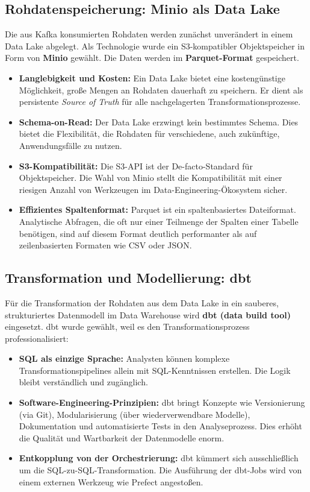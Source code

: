 \documentclass[
    12pt,               
    a4paper,        
    ngerman            
]{scrartcl}
\begin{document}
\subsection{Rohdatenspeicherung: Minio als Data Lake}
\label{subsec:minio}

Die aus Kafka konsumierten Rohdaten werden zunächst unverändert in einem Data Lake abgelegt. Als Technologie wurde ein S3-kompatibler Objektspeicher in Form von \textbf{Minio} gewählt. Die Daten werden im \textbf{Parquet-Format} gespeichert.
\begin{itemize}
    \item \textbf{Langlebigkeit und Kosten:} Ein Data Lake bietet eine kostengünstige Möglichkeit, große Mengen an Rohdaten dauerhaft zu speichern. Er dient als persistente \textit{Source of Truth} für alle nachgelagerten Transformationsprozesse.
    \item \textbf{Schema-on-Read:} Der Data Lake erzwingt kein bestimmtes Schema. Dies bietet die Flexibilität, die Rohdaten für verschiedene, auch zukünftige, Anwendungsfälle zu nutzen.
    \item \textbf{S3-Kompatibilität:} Die S3-API ist der De-facto-Standard für Objektspeicher. Die Wahl von Minio stellt die Kompatibilität mit einer riesigen Anzahl von Werkzeugen im Data-Engineering-Ökosystem sicher.
    \item \textbf{Effizientes Spaltenformat:} Parquet ist ein spaltenbasiertes Dateiformat. Analytische Abfragen, die oft nur einer Teilmenge der Spalten einer Tabelle benötigen, sind auf diesem Format deutlich performanter als auf zeilenbasierten Formaten wie CSV oder JSON.
\end{itemize}

\subsection{Transformation und Modellierung: dbt}
\label{subsec:dbt}

Für die Transformation der Rohdaten aus dem Data Lake in ein sauberes, strukturiertes Datenmodell im Data Warehouse wird \textbf{dbt (data build tool)} eingesetzt. dbt wurde gewählt, weil es den Transformationsprozess professionalisiert:
\begin{itemize}
    \item \textbf{SQL als einzige Sprache:} Analysten können komplexe Transformationspipelines allein mit SQL-Kenntnissen erstellen. Die Logik bleibt verständlich und zugänglich.
    \item \textbf{Software-Engineering-Prinzipien:} dbt bringt Konzepte wie Versionierung (via Git), Modularisierung (über wiederverwendbare Modelle), Dokumentation und automatisierte Tests in den Analyseprozess. Dies erhöht die Qualität und Wartbarkeit der Datenmodelle enorm.
    \item \textbf{Entkopplung von der Orchestrierung:} dbt kümmert sich ausschließlich um die SQL-zu-SQL-Transformation. Die Ausführung der dbt-Jobs wird von einem externen Werkzeug wie Prefect angestoßen.
\end{itemize}
\end{document}
